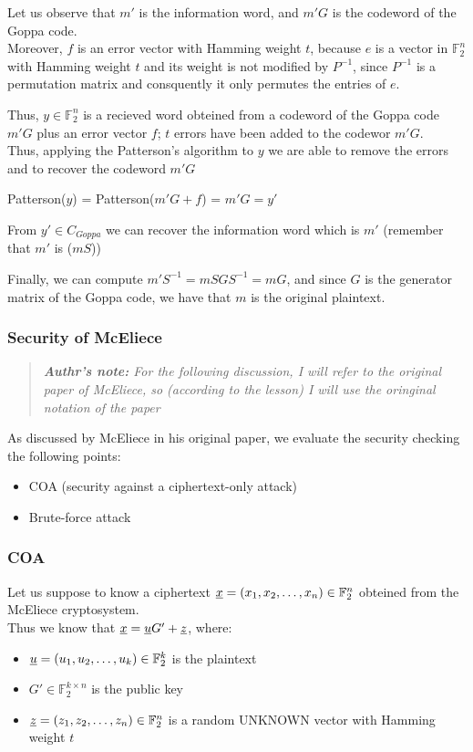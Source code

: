 \noindent
Let us observe that $m'$ is the information word, and $m'G$ is the codeword of the Goppa code.\\
Moreover, $f$ is an error vector with Hamming weight $t$, because $e$ is a vector in $\mathbb{F}_2^n$ with Hamming weight $t$ and its weight is not modified by $P^{-1}$, since $P^{-1}$ is a permutation matrix and consquently it only permutes the entries of $e$.
\medskip

\noindent
Thus, $y \in \mathbb{F}_2^n$ is a recieved word obteined from a codeword of the Goppa code $m'G$ plus an error vector $f$; $t$ errors have been added to the codewor $m'G$.\\
Thus, applying the Patterson's algorithm to $y$ we are able to remove the errors and to recover the codeword $m'G$

\begin{center}
    Patterson($y$) = Patterson($m'G + f$) = $m'G = y'$
\end{center}
\noindent
From $y' \in C_{Goppa}$  we can recover the information word which is $m'$ (remember that $m'$ is ($mS$))
\medskip

\noindent
Finally, we can compute $m'S^{-1} = mSGS^{-1} = mG$, and since $G$ is the generator matrix of the Goppa code, we have that $m$ is the original plaintext.

\subsubsection{Security of McEliece}

\begin{quotation}
    \textit{\textbf{Authr's note:} For the following discussion, I will refer to the original paper of McEliece, so (according to the lesson) I will use the oringinal notation of the paper}
\end{quotation}

\noindent
As discussed by McEliece in his original paper, we evaluate the security checking the following points:
\begin{itemize}
    \item COA (security against a ciphertext-only attack)
    \item Brute-force attack
\end{itemize}

\subsubsection*{COA}
Let us suppose to know a ciphertext $\underline{x} = (x_1, x_2, \ldots, x_n) \in \mathbb{F}_2^n$ obteined from the McEliece cryptosystem.\\
Thus we know that $\underline{x} = \underline{u}G' + \underline{z}$, where:
\begin{itemize}
    \item $\underline{u} = (u_1, u_2, \ldots, u_k) \in \mathbb{F}_2^k$ is the plaintext
    \item $G'  \in \mathbb{F}_2^{k \times n}$ is the public key
    \item $\underline{z} = (z_1, z_2, \ldots, z_n) \in \mathbb{F}_2^n$ is a random UNKNOWN vector with Hamming weight $t$ 
\end{itemize}
\vspace{1 cm}

